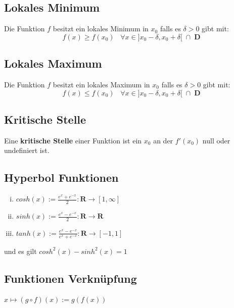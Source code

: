 \documentclass[8pt]{article}
\begin{document}
\begin{multicols*}{3}
\subsection{Lokales Minimum}

Die Funktion $f$ besitzt ein lokales Minimum in $x_0$ falls es $\delta > 0$ gibt mit:
$$f(x) \geq f(x_0) \;\;\; \forall x \in ]x_0 - \delta, x_0 + \delta[\; \cap \; \mathbf{D}$$

\subsection{Lokales Maximum}

Die Funktion $f$ besitzt ein lokales Maximum in $x_0$ falls es $\delta > 0$ gibt mit:
$$f(x) \leq f(x_0) \;\;\; \forall x \in ]x_0 - \delta, x_0 + \delta[\; \cap \; \mathbf{D}$$

\subsection{Kritische Stelle}

Eine \textbf{kritische Stelle} einer Funktion ist ein $x_0$ an der $f'(x_0)$ null
oder undefiniert ist.

\subsection{Hyperbol Funktionen}

\begin{enumerate}[(i)]
  \item $cosh(x) := \frac{e^x + e^{-x}}{2}: \mathbf{R} \rightarrow [1, \infty]$
  \item $sinh(x) := \frac{e^x - e^{-x}}{2}: \mathbf{R} \rightarrow \mathbf{R}$
  \item $tanh(x) := \frac{e^x - e^{-x}}{e^x + e^{-x}}: \mathbf{R} \rightarrow [-1, 1]$
\end{enumerate}
und es gilt $cosh^2(x) - sinh^2(x) = 1$



\subsection{Funktionen Verknüpfung}

$
x \mapsto (g \circ f)(x) := g(f(x))
$


\end{multicols*}
\end{document}
